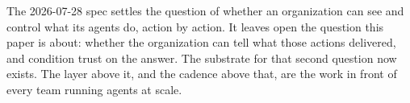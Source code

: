 The 2026-07-28 spec settles the question of whether an organization can see and
control what its agents do, action by action. It leaves open the question this
paper is about: whether the organization can tell what those actions delivered,
and condition trust on the answer. The substrate for that second question now
exists. The layer above it, and the cadence above that, are the work in front of
every team running agents at scale.
